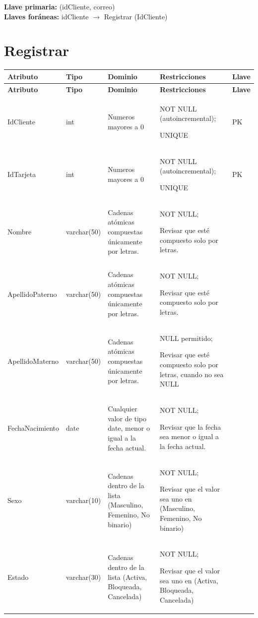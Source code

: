 \documentclass[12pt]{article}
\begin{document}
\textbf{Llave primaria:} (idCliente, correo)\\
\textbf{Llaves foráneas:} idCliente $\rightarrow$ Registrar (IdCliente)

 

\section*{Registrar}

\begin{longtable}{p{3.2cm} p{2.2cm} p{5.3cm} p{4.2cm} p{1.2cm}}
\label{tab:registrar}\\
\toprule
\textbf{Atributo} & \textbf{Tipo} & \textbf{Dominio} & \textbf{Restricciones} & \textbf{Llave} \\
\midrule
\endfirsthead

\toprule
\textbf{Atributo} & \textbf{Tipo} & \textbf{Dominio} & \textbf{Restricciones} & \textbf{Llave} \\
\midrule
\endhead

\bottomrule
\endfoot


IdCliente 
& int 
& Numeros mayores a 0
& NOT NULL (autoincremental);

UNIQUE
& PK \\

IdTarjeta 
& int 
& Numeros mayores a 0
& NOT NULL (autoincremental);

UNIQUE
& PK \\

Nombre 
& varchar(50) 
& Cadenas atómicas compuestas únicamente por letras.
& NOT NULL;

Revisar que esté compuesto solo por letras.
&  \\

ApellidoPaterno 
& varchar(50) 
& Cadenas atómicas compuestas únicamente por letras.
& NOT NULL;

Revisar que esté compuesto solo por letras.
&  \\

ApellidoMaterno 
& varchar(50) 
& Cadenas atómicas compuestas únicamente por letras.
& NULL permitido;

Revisar que esté compuesto solo por letras, cuando no sea NULL
&  \\

FechaNacimiento 
& date 
& Cualquier valor de tipo date, menor o igual a la fecha actual.
& NOT NULL;

Revisar que la fecha sea menor o igual a la fecha actual.
&  \\

Sexo 
& varchar(10) 
& Cadenas dentro de la lista (Masculino, Femenino, No binario)
& NOT NULL;

Revisar que el valor sea uno en (Masculino, Femenino, No binario)
&  \\

Estado 
& varchar(30) 
& Cadenas dentro de la lista (Activa, Bloqueada, Cancelada)
& NOT NULL;

Revisar que el valor sea uno en (Activa, Bloqueada, Cancelada)
&  \\

\end{longtable}
\end{document}

